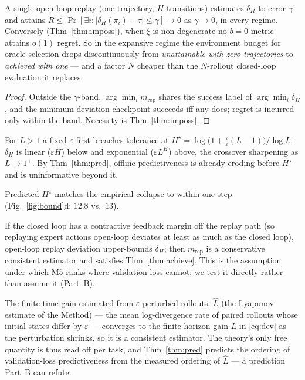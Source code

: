 \begin{theorem}\label{thm:achieve}
A single open-loop replay (one trajectory, $H$ transitions) estimates $\delta_H$ to error $\gamma$ and
attains $R\le\Pr[\exists i:|\delta_H(\pi_i)-\tau|\le\gamma]\!\to\!0$ as $\gamma\!\to\!0$, in every
regime. Conversely (Thm~\ref{thm:imposs}), when $\xi$ is non-degenerate no $b{=}0$ metric attains
$o(1)$ regret. So in the expansive regime the environment budget for oracle selection drops
discontinuously from \emph{unattainable with zero trajectories} to \emph{achieved with one} ---
and a factor $N$ cheaper than the $N$-rollout closed-loop evaluation it replaces.
\end{theorem}
\begin{proof}
Outside the $\gamma$-band, $\arg\min_i m_{\mathrm{rep}}$ shares the success label of
$\arg\min_i\delta_H$, and the minimum-deviation checkpoint succeeds iff any does; regret is incurred
only within the band. Necessity is Thm~\ref{thm:imposs}.
\end{proof}

\begin{corollary}\label{cor:wall}
For $L>1$ a fixed $\varepsilon$ first breaches tolerance at
$H^\star=\log\!\big(1+\tfrac{\tau}{\varepsilon}(L-1)\big)/\log L$: $\delta_H$ is linear ($\varepsilon H$)
below and exponential ($\varepsilon L^H$) above, the crossover sharpening as $L\!\to\!1^+$. By
Thm~\ref{thm:pred}, offline predictiveness is already eroding before $H^\star$ and is uninformative
beyond it.
\end{corollary}
Predicted $H^\star$ matches the empirical collapse to within one step (Fig.~\ref{fig:bound}d: $12.8$
vs.\ $13$).

\begin{corollary}\label{cor:m5}
If the closed loop has a contractive feedback margin off the replay path (so replaying expert actions
open-loop deviates at least as much as the closed loop), open-loop replay deviation upper-bounds
$\delta_H$; then $m_{\mathrm{rep}}$ is a conservative consistent estimator and satisfies
Thm~\ref{thm:achieve}. This is the assumption under which M5 ranks where validation loss cannot; we
test it directly rather than assume it (Part~B).
\end{corollary}

\begin{proposition}\label{prop:measurable}
The finite-time gain estimated from $\varepsilon$-perturbed rollouts, $\hat L$ (the Lyapunov estimate
of the Method) --- the mean log-divergence rate of paired rollouts whose initial states differ by
$\varepsilon$ --- converges to the finite-horizon gain $L$ in \eqref{eq:dev} as the perturbation
shrinks, so it is a consistent estimator. The theory's only free quantity is thus read off per task,
and Thm~\ref{thm:pred} predicts the ordering of validation-loss predictiveness from the measured
ordering of $\hat L$ --- a prediction Part~B can refute.
\end{proposition}

